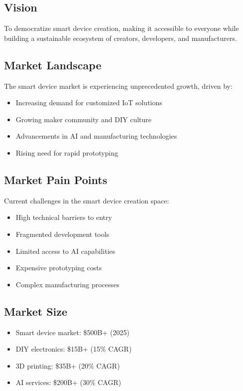 \subsection{Vision}
To democratize smart device creation, making it accessible to everyone while building a sustainable ecosystem of creators, developers, and manufacturers.

\subsection{Market Landscape}
The smart device market is experiencing unprecedented growth, driven by:
\begin{itemize}[leftmargin=*]
    \item Increasing demand for customized IoT solutions
    \item Growing maker community and DIY culture
    \item Advancements in AI and manufacturing technologies
    \item Rising need for rapid prototyping
\end{itemize}

\subsection{Market Pain Points}
Current challenges in the smart device creation space:
\begin{itemize}[leftmargin=*]
    \item High technical barriers to entry
    \item Fragmented development tools
    \item Limited access to AI capabilities
    \item Expensive prototyping costs
    \item Complex manufacturing processes
\end{itemize}

\subsection{Market Size}
\begin{itemize}[leftmargin=*]
    \item Smart device market: \$500B+ (2025)
    \item DIY electronics: \$15B+ (15\% CAGR)
    \item 3D printing: \$35B+ (20\% CAGR)
    \item AI services: \$200B+ (30\% CAGR)
\end{itemize} 